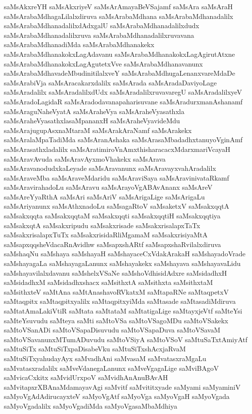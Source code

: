 {saMsAkxreYH
saMsAkxriyeV
saMsArAmayaBeVSajamf
saMsAra
saMsAraH
saMsArabaMdhagaLilalxdiruva
saMsArabaMdhana
saMsArabaMdhanadalilx
saMsArabaMdhanadalilxdAdxgalU
saMsArabaMdhanadalilxdudx
saMsArabaMdhanadalilxruva
saMsArabaMdhanadalilxruvavana
saMsArabaMdhanadiMda
saMsArabaMdhanakekx
saMsArabaMdhanakokxLagAdavanu
saMsArabaMdhanakokxLagAgirutAtxne
saMsArabaMdhanakokxLagAgutetxVve
saMsArabaMdhanavanunx
saMsArabaMdhavadeMbudinitilalxveY
saMsArabaMdhugaLenanxvareMdaDe
saMsArabiVja
saMsAracakarxdalilx
saMsArada
saMsAradaDaviyoLage
saMsAradalilx
saMsAradalilxdUdx
saMsAradalilxruvavaregU
saMsAradalilxyeV
saMsAradoLagidaR
saMsAradodavanapaharisuvane
saMsAradurxmanAshanamf
saMsAraguNaheVyatA
saMsAraheVya
saMsAraheVyasathxla
saMsAraheVyasathxlasaMpananxH
saMsAraheVyavideMdu
saMsArajugupAsxnaMtaraM
saMsArakAraNamf
saMsArakekx
saMsAralaMpaTadiMda
saMsAranAshaka
saMsArasaMbadadhxtanuyoVginAmf
saMsArasathxladalilx
saMsAratimiroVnAmxthisharacacxMdarxmariVcayaH
saMsAravAvuda
saMsAravAyxmoVhakekx
saMsArava
saMsAravanodudxkaLeyade
saMsAravanunx
saMsAravayxvahAradalilx
saMsAraveMba
saMsAraveMdaridu
saMsAraviSaya
saMsAravinivataRkamf
saMsAravirahadoLu
saMsAravu
saMsArayoVgABAvAnanx
saMsAreV
saMsAreYyaRthA
saMsAri
saMsAriV
saMsArigaLige
saMsArigaLu
saMsAriyanunx
saMsAthxnadoLu
saMsagaRtoV
saMsaketxV
saMsakxqqtA
saMsakxqqta
saMsakxqqtaM
saMsakxqqti
saMsakxqqtiH
saMsakxqqtiya
saMsakxqtA
saMsakxripudu
saMsakxrisade
saMsakxrisalapxTaTx
saMsakxrisalapxTuTx
saMsakxrisidaRliMgamaM
saMsakxrisiyaMtA
saMsapxqqsheVdacaRnAvidhw
saMsapxshARtf
saMsapxshaRvilalxdiruva
saMshaqNu
saMshaya
saMshayaH
saMshayaceCxVdakArakaH
saMshayadoVrade
saMshayagaLa
saMshayagaLanunx
saMshayakekx
saMshayava
saMshayavaLidu
saMshayavilalxdavanu
saMshelxVSaNe
saMshoVdhisidAdxre
saMsidadhxH
saMsidadhxM
saMsidadhxshacx
saMsithxtA
saMsithxta
saMsithxtaM
saMsithxteV
saMtAna
saMtAnashavoRVkatxM
saMtapaRNe
saMtaqpetxV
saMtaqpitx
saMtaqpitxyalilx
saMtaqpitxyiMda
saMtasade
saMtasadiMdiruva
saMtatAmaLakiVtiR
saMtata
saMtataM
saMtatigaLige
saMtayxjeVtf
saMteYsi
saMteYsuvudu
saMteya
saMti
saMtoVSa
saMtoVSagoMDu
saMtoVSakekx
saMtoVSanADi
saMtoVSapaDisuvudu
saMtoVSapaDuva
saMtoVSavaM
saMtoVSavanunxMTumADuvudu
saMtoVSiyA
saMtoVSoV
saMtuSaTxtAmiyAtf
saMtuSiTx
saMtuSiTxpaDisabeVku
saMtuSiTxshAcxjaRvaM
saMtuSiTxyahudayAyx
saMvadhAni
saMvasaM
saMvatasxraMgaLu
saMvatasxradalilx
saMveVdanegaLanunx
saMveVgagaLige
saMviBAgoV
saMvicaCxkitx
saMvidUrxpoV
saMvidhAnAnuBAvAH
saMvitapxrXBAnaMdamayavAgi
saMvitf
saMvititxyade
saMyami
saMyaminiV
saMyoVgAdAdirucayxteV
saMyoVgAtf
saMyoVga
saMyoVgaH
saMyoVgada
saMyoVgadalilx
saMyoVgadiMda
saMyoVgasaMbaMdhiya
}
